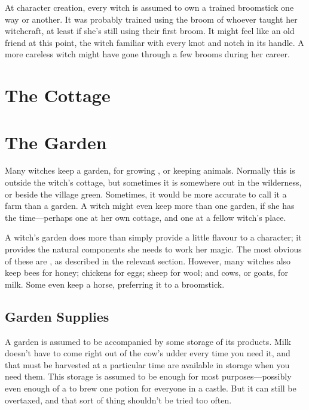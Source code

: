 At character creation, every witch is assumed to own a trained broomstick one way or another.
It was probably trained using the broom of whoever taught her witchcraft, at least if she's still using their first broom.
It might feel like an old friend at this point, the witch familiar with every knot and notch in its handle.
A more careless witch might have gone through a few brooms during her career.



\section{The Cottage}

\section{The Garden}

Many witches keep a garden, for growing , or keeping animals.
Normally this is outside the witch's cottage, but sometimes it is somewhere out in the wilderness, or beside the village green.
Sometimes, it would be more accurate to call it a farm than a garden.
A witch might even keep more than one garden, if she has the time---perhaps one at her own cottage, and one at a fellow witch's place.

A witch's garden does more than simply provide a little flavour to a character; it provides the natural components she needs to work her magic.
The most obvious of these are , as described in the relevant section.
However, many witches also keep bees for honey; chickens for eggs; sheep for wool; and cows, or goats, for milk.
Some even keep a horse, preferring it to a broomstick.

\subsection{Garden Supplies}

A garden is assumed to be accompanied by some storage of its products.
Milk doesn't have to come right out of the cow's udder every time you need it, and  that must be harvested at a particular time are available in storage when you need them.
This storage is assumed to be enough for most purposes---possibly even enough of a  to brew one potion for everyone in a castle.
But it can still be overtaxed, and that sort of thing shouldn't be tried too often.

